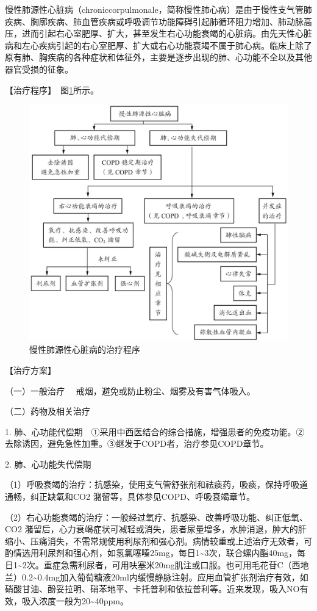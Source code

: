 慢性肺源性心脏病（chroniccorpulmonale，简称慢性肺心病）是由于慢性支气管肺疾病、胸廓疾病、肺血管疾病或呼吸调节功能障碍引起肺循环阻力增加、肺动脉高压，进而引起右心室肥厚、扩大，甚至发生右心功能衰竭的心脏病。由先天性心脏病和左心疾病引起的右心室肥厚、扩大或右心功能衰竭不属于肺心病。临床上除了原有肺、胸疾病的各种症状和体征外，主要是逐步出现的肺、心功能不全以及其他器官受损的征象。

【治疗程序】　图\ref{fig1-5-1}所示。

\begin{figure}[!htbp]
 \centering
 \includegraphics{./images/Image00006.jpg}
 \captionsetup{justification=centering}
 \caption{慢性肺源性心脏病的治疗程序}
 \label{fig1-5-1}
  \end{figure} 

【治疗方案】

{（一）一般治疗} 　戒烟，避免或防止粉尘、烟雾及有害气体吸入。

{（二）药物及相关治疗}

1.
肺、心功能代偿期　①采用中西医结合的综合措施，增强患者的免疫功能。②去除诱因，避免急性加重。③继发于COPD者，治疗参见COPD章节。

2. 肺、心功能失代偿期

（1）呼吸衰竭的治疗：抗感染，使用支气管舒张剂和祛痰药，吸痰，保持呼吸道通畅，纠正缺氧和CO{2}
潴留等，具体参见COPD、呼吸衰竭章节。

（2）右心功能衰竭的治疗：一般经过氧疗、抗感染、改善呼吸功能、纠正低氧、CO{2}
潴留后，心力衰竭症状可减轻或消失，患者尿量增多，水肿消退，肿大的肝缩小、压痛消失，不需常规使用利尿剂和强心剂。病情较重或上述治疗无效者，可酌情选用利尿剂和强心剂，如氢氯噻嗪25mg，每日1\textasciitilde{}3次，联合螺内酯40mg，每日1\textasciitilde{}2次。重症急需利尿者，可用呋塞米20mg肌注或口服。也可用毛花苷C（西地兰）0.2\textasciitilde{}0.4mg加入葡萄糖液20ml内缓慢静脉注射。应用血管扩张剂治疗有效，如硝酸甘油、酚妥拉明、硝苯地平、卡托普利和依拉普利等。近来发现，吸入NO有效，吸入浓度一般为20\textasciitilde{}40ppm。

